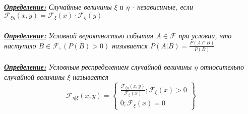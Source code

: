 \documentclass[a4paper,12pt]{article}
\begin{document}
\textit{\textbf{\underline{Определение:}} Случайные величины $\xi$ и $\eta$ - независимые, если $\mathcal{F}_{\xi \eta}(x, y) = \mathcal{F}_{\xi}(x)\cdot  \mathcal{F}_{\eta}(y)$}
\\
\\
\textit{\textbf{\underline{Определение:}} Условной вероятностью события $A \in \mathcal{F}$ при условии, что наступило $B \in \mathcal{F}, (P(B)>0) $ называется $P(A|B)= \frac{P(A \cap B)}{P(B)}$ }
\\
\\
\textit{\textbf{\underline{Определение:}} Условным респределением случайной величины $\eta$ относительно случайной величины $\xi$ называется
\[ 
\mathcal{F}_{\eta|\xi}(x,y) = \left\{ \begin{array}{l}
        \frac{\mathcal{F}_{\xi \eta}(x,y)}{\mathcal{F}_{\xi}(x)}; \mathcal{F}_{\xi}(x)>0\\
        0; \mathcal{F}_{\xi}(x)=0
        \end{array}
    \right\}
\]
}
\end{document}

